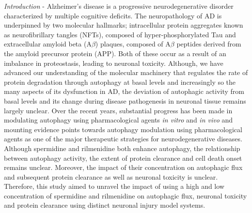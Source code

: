 \textit{Introduction} - Alzheimer’s disease is a progressive neurodegenerative disorder characterized by multiple cognitive deficits. The neuropathology of AD is underpinned by two molecular hallmarks; intracellular protein aggregates known as neurofibrillary tangles (NFTs), composed of hyper-phosphorylated Tau and extracellular amyloid beta (A$\beta$) plaques, composed of A$\beta$ peptides derived from the amyloid precursor protein (APP). Both of these occur as a result of an imbalance in proteostasis, leading to neuronal toxicity. Although, we have advanced our understanding of the molecular machinery that regulates the rate of protein degradation through autophagy at basal levels and increasingly so the many aspects of its dysfunction in AD, the deviation of autophagic activity from basal levels and its change during disease pathogenesis in neuronal tissue remains largely unclear. Over the recent years, substantial progress has been made in modulating autophagy using pharmacological agents \textit{in vitro} and \textit{in vivo} and mounting evidence points towards autophagy modulation using pharmacological agents as one of the major therapeutic strategies for neurodegenerative diseases. Although spermidine and rilmenidine both enhance autophagy, the relationship between autophagy activity, the extent of protein clearance and cell death onset remains unclear. Moreover, the impact of their concentration on autophagic flux and subsequent protein clearance as well as neuronal toxicity is unclear. Therefore, this study aimed to unravel the impact of using a high and low concentration of spermidine and rilmenidine on autophagic flux, neuronal toxicity and protein clearance using distinct neuronal injury model systems. 

